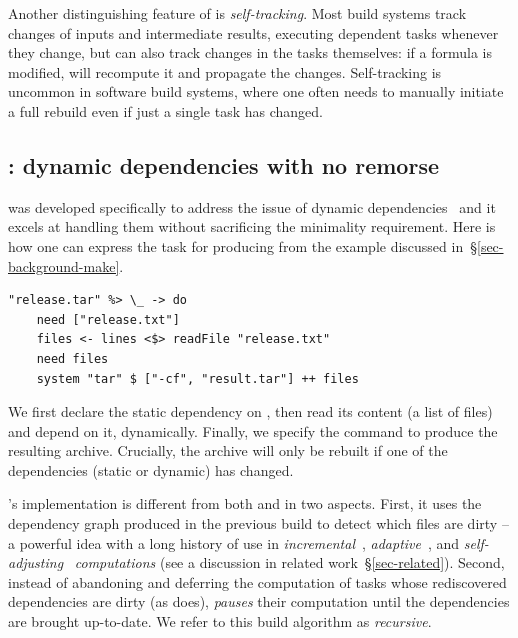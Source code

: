 Another distinguishing feature of \Excel is \emph{self-tracking}. Most build
systems track changes of inputs and intermediate results, executing dependent
tasks whenever they change, but \Excel can also track changes in the tasks
themselves: if a formula is modified, \Excel will recompute it and propagate
the changes. Self-tracking is uncommon in software build systems, where one
often needs to manually initiate a full rebuild even if just a single task has
changed.

\subsection{\Shake: dynamic dependencies with no remorse}
\label{sec-background-shake}

\Shake was developed specifically to address the issue of dynamic
dependencies~\cite{mitchell2012shake} and it excels at handling them without
sacrificing the minimality requirement. Here is how one can express the task
for producing  from the example discussed
in~\S\ref{sec-background-make}.

\vspace{1mm}
\begin{verbatim}
"release.tar" %> \_ -> do
    need ["release.txt"]
    files <- lines <$> readFile "release.txt"
    need files
    system "tar" $ ["-cf", "result.tar"] ++ files
\end{verbatim}
\vspace{1mm}

\noindent
We first declare the static dependency on , then read its
content (a list of files) and depend on it, dynamically. Finally, we specify the
command to produce the resulting archive. Crucially, the archive will only be
rebuilt if one of the dependencies (static or dynamic) has changed.

\Shake's implementation is different from both \Make and \Excel in two aspects.
First, it uses the dependency graph produced in the previous build to detect
which files are dirty -- a powerful idea with a long history of use in
\emph{incremental}~\cite{demers1981incremental},
\emph{adaptive}~\cite{acar2002adaptive}, and
\emph{self-adjusting}~\cite{acar2007selfadjusting} \emph{computations} (see a
discussion in related work~\S\ref{sec-related}). Second, instead of abandoning
and deferring the computation of tasks whose rediscovered dependencies are dirty
(as \Excel does), \Shake \emph{pauses} their computation until the dependencies
are brought up-to-date. We refer to this build algorithm as \emph{recursive}.

